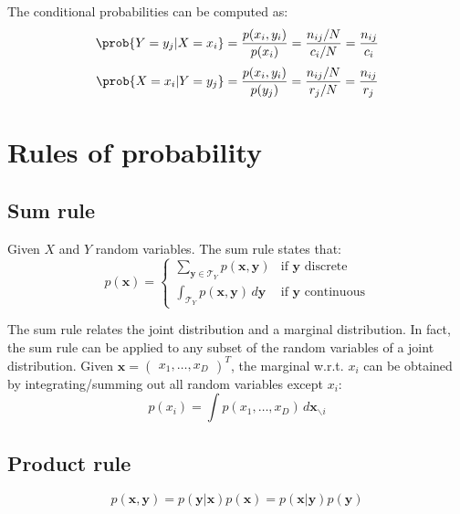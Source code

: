 \begin{description}
\begin{example}
            The conditional probabilities can be computed as:
            \[ \prob{Y = y_j \vert X = x_i} = \frac{p(x_i, y_i)}{p(x_i)} = \frac{n_{ij}/N}{c_i/N} = \frac{n_{ij}}{c_i} \]
            \[ \prob{X = x_i \vert Y = y_j} = \frac{p(x_i, y_i)}{p(y_j)} = \frac{n_{ij}/N}{r_j/N} = \frac{n_{ij}}{r_j} \]
        \end{example}
\end{description}



\section{Rules of probability}

\subsection{Sum rule}
Given $X$ and $Y$ random variables. The sum rule states that:
\[
    p(\bm{x}) =
    \begin{cases}
        \sum_{\bm{y} \in \mathcal{T}_Y} p(\bm{x}, \bm{y}) & \text{if } \bm{y} \text{ discrete} \\
        \int_{\mathcal{T}_Y} p(\bm{x}, \bm{y}) \,d\bm{y} & \text{if } \bm{y} \text{ continuous}
    \end{cases}
\]

The sum rule relates the joint distribution and a marginal distribution.
In fact, the sum rule can be applied to any subset of the random variables of a joint distribution.
Given $\bm{x} = \begin{pmatrix} x_1, \dots, x_D \end{pmatrix}^T$, 
the marginal w.r.t. $x_i$ can be obtained by integrating/summing out all random variables except $x_i$:
\[ p(x_i) = \int p(x_1, \dots, x_D) \,d\bm{x}_{\backslash i} \]

\subsection{Product rule}
\[ p(\bm{x}, \bm{y}) = p(\bm{y} \vert \bm{x}) p(\bm{x}) = p(\bm{x} \vert \bm{y}) p(\bm{y}) \]



